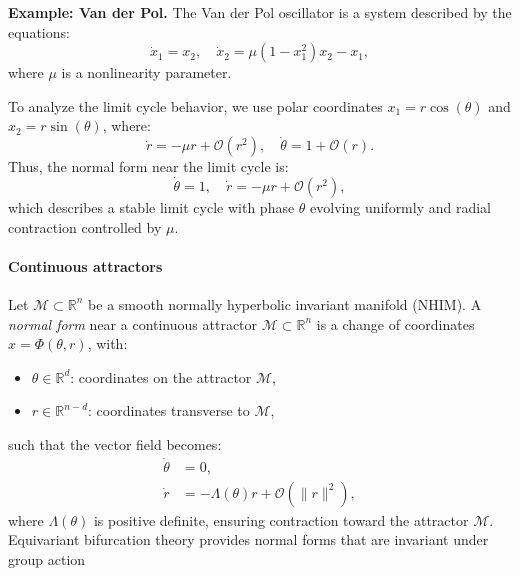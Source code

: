 \documentclass{article}
\theoremstyle{definition} \newtheorem{definition}{Definition}  \newtheorem{example}{Example}
\theoremstyle{remark} \newtheorem{remark}{Remark}
\newcounter{ct}
\newcommand{\field}[1]{\ensuremath{\mathbb{#1}}}
\newcommand{\reals}{\field{R}}
\newcommand{\manifold}{\mathcal{M}}
\begin{document}
\textbf{Example: Van der Pol.} 
The Van der Pol oscillator is a system described by the equations:
\[
\dot{x}_1 = x_2, \quad \dot{x}_2 = \mu (1 - x_1^2) x_2 - x_1,
\]
where \( \mu \) is a nonlinearity parameter.

To analyze the limit cycle behavior, we use polar coordinates \( x_1 = r \cos(\theta) \) and \( x_2 = r \sin(\theta) \), where:
\[
\dot{r} = -\mu r + \mathcal{O}(r^2), \quad \dot{\theta} = 1 + \mathcal{O}(r).
\]
Thus, the normal form near the limit cycle is:
\[
\dot{\theta} = 1, \quad \dot{r} = -\mu r + \mathcal{O}(r^2),
\]
which describes a stable limit cycle with phase \( \theta \) evolving uniformly and radial contraction controlled by \( \mu \).


\paragraph{Continuous attractors}%
Let $\manifold\subset\reals^n$  be a smooth normally hyperbolic invariant manifold (NHIM).
A \emph{normal form} near a continuous attractor \(\manifold \subset \mathbb{R}^n \) is a change of coordinates 
\( x = \Phi(\theta, r) \), with:
\begin{itemize}
  \item \( \theta \in \mathbb{R}^d \): coordinates on the attractor \( \manifold\),
  \item \( r \in \mathbb{R}^{n-d} \): coordinates transverse to \(\manifold \),
\end{itemize}
such that the vector field becomes:
\[
\begin{aligned}
\dot{\theta} &= 0, \\
\dot{r} &= -\Lambda(\theta) r + \mathcal{O}(\|r\|^2),
\end{aligned}
\]
where \( \Lambda(\theta) \) is positive definite, ensuring contraction toward the attractor \(\manifold\).
%
Equivariant bifurcation theory provides normal forms that are invariant under group action


\end{document}
